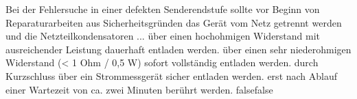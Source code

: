     {Bei der Fehlersuche in einer defekten Senderendstufe sollte vor Beginn von Reparaturarbeiten aus Sicherheitsgründen das Gerät vom Netz getrennt werden und die Netzteilkondensatoren ...}
    {über einen hochohmigen Widerstand mit ausreichender Leistung dauerhaft entladen werden.}
    {über einen sehr niederohmigen Widerstand (< 1 Ohm / 0,5 W) sofort vollständig entladen werden.}
    {durch Kurzschluss über ein Strommessgerät sicher entladen werden.}
    {erst nach Ablauf einer Wartezeit von ca. zwei Minuten berührt werden.}
    {false}{false}